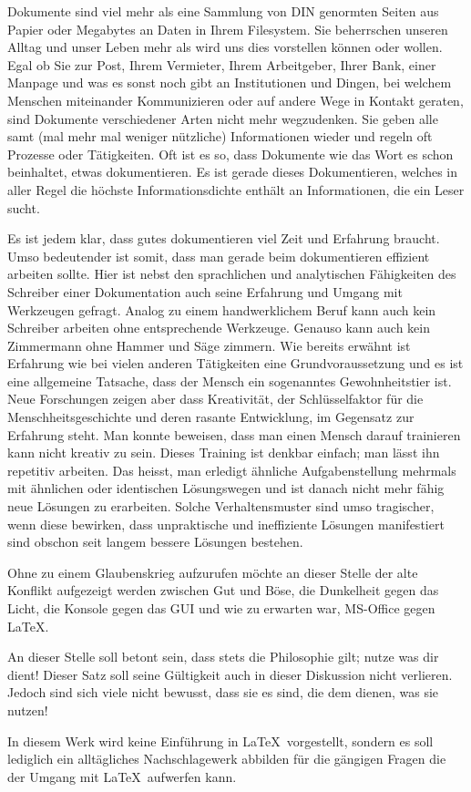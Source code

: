 
\noindent
Dokumente sind viel mehr als eine Sammlung von DIN
genormten Seiten aus Papier oder Megabytes an Daten in Ihrem
Filesystem. Sie beherrschen unseren Alltag und unser
Leben mehr als wird uns dies vorstellen können oder wollen.
Egal ob Sie zur Post, Ihrem Vermieter, Ihrem Arbeitgeber,
Ihrer Bank, einer Manpage und was es sonst noch gibt an
Institutionen und Dingen, bei welchem Menschen miteinander
Kommunizieren oder auf andere Wege in Kontakt geraten, sind
Dokumente verschiedener Arten nicht mehr wegzudenken. Sie
geben alle samt (mal mehr mal weniger nützliche)
Informationen wieder und regeln oft Prozesse oder
Tätigkeiten. Oft ist es so, dass Dokumente wie das Wort es
schon beinhaltet, etwas dokumentieren. Es ist gerade dieses
Dokumentieren, welches in aller Regel die höchste
Informationsdichte enthält an Informationen, die ein Leser
sucht. 

Es ist jedem klar, dass gutes dokumentieren viel Zeit
und Erfahrung braucht. Umso bedeutender ist somit, dass man
gerade beim dokumentieren effizient arbeiten sollte. Hier
ist nebst den sprachlichen und analytischen Fähigkeiten des
Schreiber einer Dokumentation auch seine Erfahrung und
Umgang mit Werkzeugen gefragt. Analog zu einem
handwerklichem Beruf kann auch kein Schreiber arbeiten ohne
entsprechende Werkzeuge. Genauso kann auch kein Zimmermann
ohne Hammer und Säge zimmern. Wie bereits erwähnt ist
Erfahrung wie bei vielen anderen Tätigkeiten eine
Grundvoraussetzung und es ist eine allgemeine Tatsache, dass
der Mensch ein sogenanntes Gewohnheitstier ist. Neue
Forschungen zeigen aber dass Kreativität, der
Schlüsselfaktor für die Menschheitsgeschichte und deren
rasante Entwicklung, im Gegensatz zur Erfahrung steht. Man
konnte beweisen, dass man einen Mensch darauf trainieren
kann nicht kreativ zu sein. Dieses Training ist denkbar
einfach; man lässt ihn repetitiv arbeiten. Das heisst, man
erledigt ähnliche Aufgabenstellung mehrmals mit ähnlichen
oder identischen Lösungswegen und ist danach nicht mehr
fähig neue Lösungen zu erarbeiten. Solche Verhaltensmuster
sind umso tragischer, wenn diese bewirken, dass
unpraktische und ineffiziente Lösungen manifestiert sind
obschon seit langem bessere Lösungen bestehen. 

Ohne zu einem Glaubenskrieg aufzurufen möchte an dieser
Stelle der alte Konflikt aufgezeigt werden zwischen Gut und
Böse, die Dunkelheit gegen das Licht, die Konsole gegen das
GUI und wie zu erwarten war, MS-Office gegen \LaTeX.

An dieser Stelle soll betont sein, dass stets die
Philosophie gilt; nutze was dir dient! Dieser Satz soll
seine Gültigkeit auch in dieser Diskussion nicht
verlieren. Jedoch sind sich viele nicht bewusst, dass sie
es sind, die dem dienen, was sie nutzen! 

In diesem Werk wird keine Einführung in \LaTeX~vorgestellt,
sondern es soll lediglich ein alltägliches Nachschlagewerk
abbilden für die gängigen Fragen die der Umgang mit
\LaTeX~aufwerfen kann.